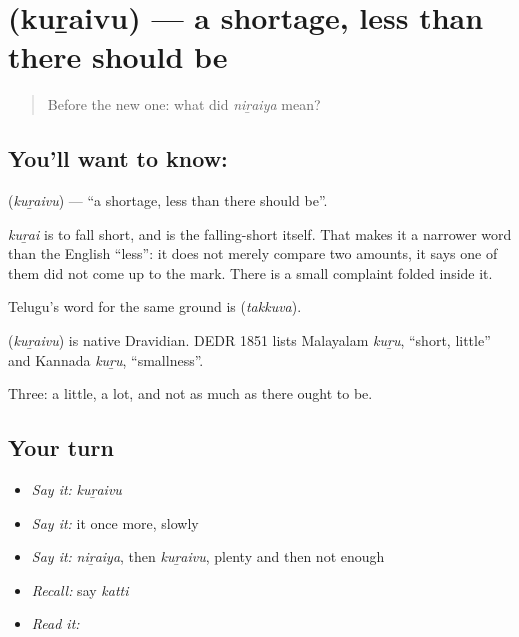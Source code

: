 \section[\texorpdfstring{\ta{குறைவு} (kuṟaivu)}{குறைவு (kuṟaivu)}]{ (kuṟaivu) — a shortage, less than there should be}

\label{lesson:TA-C56-less}



\begin{quote}
Before the new one: what did \emph{niṟaiya} mean?
\end{quote}

\subsection*{You'll want to know: }
\textbf{} (\emph{kuṟaivu}) — \textquotedblleft{}a shortage, less than there should be\textquotedblright{}.

\emph{kuṟai} is to fall short, and  is the falling-short itself. That makes it a narrower word than the English \textquotedblleft{}less\textquotedblright{}: it does not merely compare two amounts, it says one of them did not come up to the mark. There is a small complaint folded inside it.

Telugu's word for the same ground is  (\emph{takkuva}).

\begin{cousinweb}
\textbf{} (\emph{kuṟaivu}) is native Dravidian. DEDR 1851 lists Malayalam \emph{kuṟu}, \textquotedblleft{}short, little\textquotedblright{} and Kannada \emph{kuṟu}, \textquotedblleft{}smallness\textquotedblright{}.
\end{cousinweb}

\begin{grammarlens}[title={What you've built}]
Three: a little, a lot, and not as much as there ought to be.
\end{grammarlens}

\subsection*{Your turn}
\begin{itemize}
\raggedright
  \item \emph{Say it:} \emph{kuṟaivu}
  \item \emph{Say it:} it once more, slowly
  \item \emph{Say it:} \emph{niṟaiya}, then \emph{kuṟaivu}, plenty and then not enough
  \item \emph{Recall:} say \emph{katti}
  \item \emph{Read it:} \textbf{}
\end{itemize}

